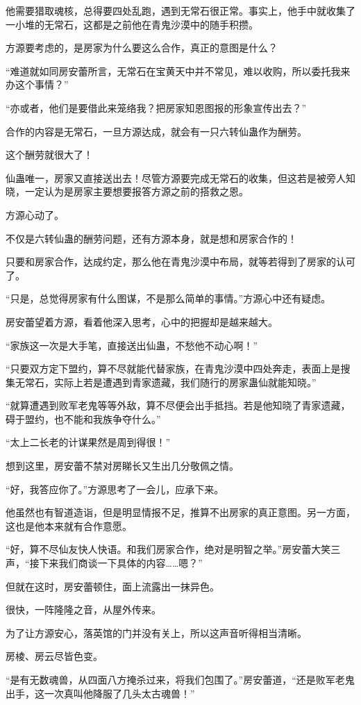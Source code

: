 \begin{this_body}
他需要猎取魂核，总得要四处乱跑，遇到无常石很正常。事实上，他手中就收集了一小堆的无常石，这都是之前他在青鬼沙漠中的随手积攒。

方源要考虑的，是房家为什么要这么合作，真正的意图是什么？

“难道就如同房安蕾所言，无常石在宝黄天中并不常见，难以收购，所以委托我来办这个事情？”

“亦或者，他们是要借此来笼络我？把房家知恩图报的形象宣传出去？”

合作的内容是无常石，一旦方源达成，就会有一只六转仙蛊作为酬劳。

这个酬劳就很大了！

仙蛊唯一，房家又直接送出去！尽管方源要完成无常石的收集，但这若是被旁人知晓，一定认为是房家主要想要报答方源之前的搭救之恩。

方源心动了。

不仅是六转仙蛊的酬劳问题，还有方源本身，就是想和房家合作的！

只要和房家合作，达成约定，那么他在青鬼沙漠中布局，就等若得到了房家的认可了。

“只是，总觉得房家有什么图谋，不是那么简单的事情。”方源心中还有疑虑。

房安蕾望着方源，看着他深入思考，心中的把握却是越来越大。

“家族这一次是大手笔，直接送出仙蛊，不愁他不动心啊！”

“只要双方定下盟约，算不尽就能代替家族，在青鬼沙漠中四处奔走，表面上是搜集无常石，实际上若是遭遇到青家遗藏，我们随行的房家蛊仙就能知晓。”

“就算遭遇到败军老鬼等等外敌，算不尽便会出手抵挡。若是他知晓了青家遗藏，碍于盟约，也不能和我族争夺什么。”

“太上二长老的计谋果然是周到得很！”

想到这里，房安蕾不禁对房睇长又生出几分敬佩之情。

“好，我答应你了。”方源思考了一会儿，应承下来。

他虽然也有智道造诣，但是明显情报不足，推算不出房家的真正意图。另一方面，这也是他本来就有合作意愿。

“好，算不尽仙友快人快语。和我们房家合作，绝对是明智之举。”房安蕾大笑三声，“接下来我们商谈一下具体的内容……嗯？”

但就在这时，房安蕾顿住，面上流露出一抹异色。

很快，一阵隆隆之音，从屋外传来。

为了让方源安心，落英馆的门并没有关上，所以这声音听得相当清晰。

房棱、房云尽皆色变。

“是有无数魂兽，从四面八方掩杀过来，将我们包围了。”房安蕾道，“还是败军老鬼出手，这一次真叫他降服了几头太古魂兽！”


\end{this_body}
